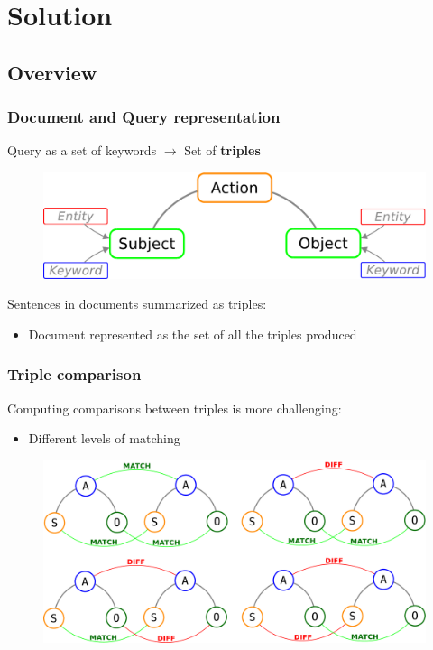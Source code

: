 \documentclass{beamer}
\begin{document}
\section{Solution}
\subsection{Overview}

\begin{frame}
\frametitle{Document and Query representation}
Query as a set of keywords $\rightarrow$ Set of {\bfseries triples}\\
\smallskip
\begin{figure}
\includegraphics[scale=0.4]{imgs/triple}
\end{figure}
\medskip
Sentences in documents summarized as triples:
\begin{itemize}
\item Document represented as the set of all the triples produced
\end{itemize}
\end{frame}

\begin{frame}
\frametitle{Triple comparison}
Computing comparisons between triples is more challenging:
\begin{itemize}
\item Different levels of matching
\end{itemize}
\begin{figure}
\includegraphics[scale=0.3]{imgs/tricmp}
\end{figure}
\end{frame}
\end{document}
